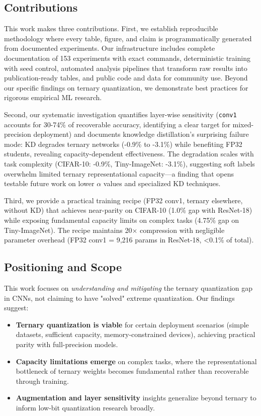 \subsection{Contributions}

This work makes three contributions. First, we establish reproducible methodology where every table, figure, and claim is programmatically generated from documented experiments. Our infrastructure includes complete documentation of 153 experiments with exact commands, deterministic training with seed control, automated analysis pipelines that transform raw results into publication-ready tables, and public code and data for community use. Beyond our specific findings on ternary quantization, we demonstrate best practices for rigorous empirical ML research.

Second, our systematic investigation quantifies layer-wise sensitivity (\texttt{conv1} accounts for 30-74\% of recoverable accuracy, identifying a clear target for mixed-precision deployment) and documents knowledge distillation's surprising failure mode: KD degrades ternary networks (-0.9\% to -3.1\%) while benefiting FP32 students, revealing capacity-dependent effectiveness. The degradation scales with task complexity (CIFAR-10: -0.9\%, Tiny-ImageNet: -3.1\%), suggesting soft labels overwhelm limited ternary representational capacity—a finding that opens testable future work on lower $\alpha$ values and specialized KD techniques.

Third, we provide a practical training recipe (FP32 conv1, ternary elsewhere, without KD) that achieves near-parity on CIFAR-10 (1.0\% gap with ResNet-18) while exposing fundamental capacity limits on complex tasks (4.75\% gap on Tiny-ImageNet). The recipe maintains 20× compression with negligible parameter overhead (FP32 conv1 = 9,216 params in ResNet-18, <0.1\% of total).

\subsection{Positioning and Scope}

This work focuses on \textit{understanding and mitigating} the ternary quantization gap in CNNs, not claiming to have "solved" extreme quantization. Our findings suggest:

\begin{itemize}
    \item \textbf{Ternary quantization is viable} for certain deployment scenarios (simple datasets, sufficient capacity, memory-constrained devices), achieving practical parity with full-precision models.
    \item \textbf{Capacity limitations emerge} on complex tasks, where the representational bottleneck of ternary weights becomes fundamental rather than recoverable through training.
    \item \textbf{Augmentation and layer sensitivity} insights generalize beyond ternary to inform low-bit quantization research broadly.
\end{itemize}

